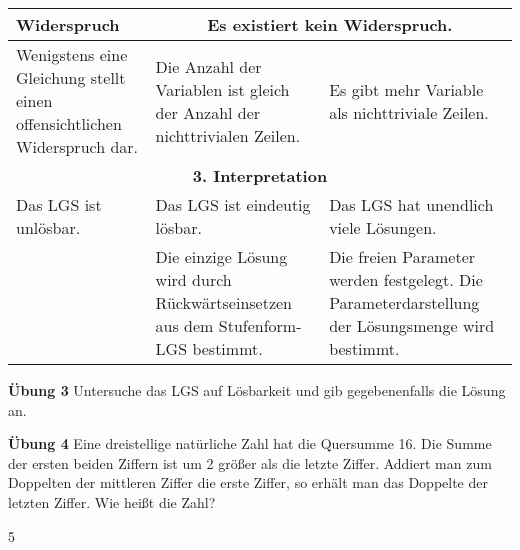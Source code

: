 \documentclass{article}
\begin{document}
\begin{center}
\renewcommand{\arraystretch}{1.5}
\begin{tabular}{|p{3.5cm}|p{3.5cm}|p{3.5cm}|}
\hline
\textbf{Widerspruch} & \multicolumn{2}{c|}{\textbf{Es existiert kein Widerspruch.}} \\
\hline
Wenigstens eine Gleichung stellt einen offensichtlichen Widerspruch dar. & Die Anzahl der Variablen ist gleich der Anzahl der nichttrivialen Zeilen. & Es gibt mehr Variable als nichttriviale Zeilen. \\
\hline
\multicolumn{3}{|c|}{\textbf{3. Interpretation}} \\
\hline
Das LGS ist unlösbar. & Das LGS ist eindeutig lösbar. & Das LGS hat unendlich viele Lösungen. \\
\hline
& Die einzige Lösung wird durch Rückwärtseinsetzen aus dem Stufenform-LGS bestimmt. & Die freien Parameter werden festgelegt. Die Parameterdarstellung der Lösungsmenge wird bestimmt. \\
\hline
\end{tabular}
\end{center}

\textbf{Übung 3} Untersuche das LGS auf Lösbarkeit und gib gegebenenfalls die Lösung an.

\textbf{Übung 4} Eine dreistellige natürliche Zahl hat die Quersumme 16. Die Summe der ersten beiden Ziffern ist um 2 größer als die letzte Ziffer. Addiert man zum Doppelten der mittleren Ziffer die erste Ziffer, so erhält man das Doppelte der letzten Ziffer. Wie heißt die Zahl?

\hfill 5
\end{document}
